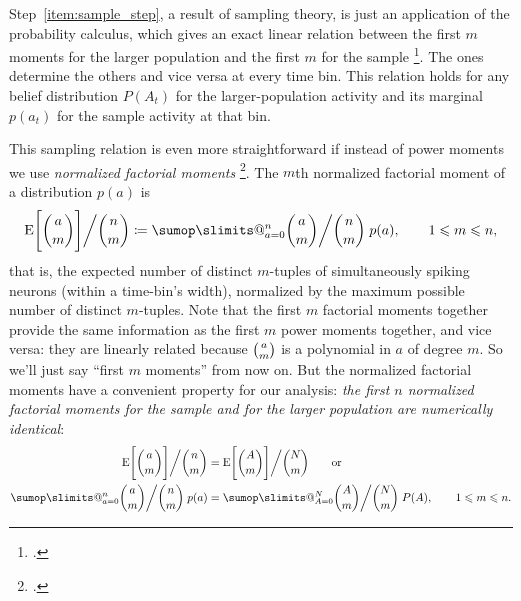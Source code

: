 \documentclass[\ifafour a4paper,12pt,\else a5paper,10pt,\fi%
onecolumn,oneside,article,%
british%
]{memoir}
\makeatletter
\theoremstyle{remark}
\theoremstyle{innote}
\def\sum{\DOTSI\sumop\slimits@}
\newcommand*{\citep}{\footcites}
\newcommand*{\defd}{\coloneqq}
\renewcommand*{\le}{\leqslant}%
\newcommand*{\E}{\mathrm{E}}
\renewcommand*{\|}{\nonscript\,\vert\nonscript\;\mathopen{}}
\newcommand*{\eqns}{eqs}%
\newcommand*{\yAv}{A}
\newcommand*{\yav}{a}
\newcommand*{\ya}{\yav}%
\newcommand*{\yA}{\yAv}%
\newcommand*{\yH}{\varIota}
\newcommand*{\px}{P_{\text{me}}}
\newcommand*{\pxx}{p}
\newcommand*{\pxxx}{P}
\makeatother
\begin{document}
\medskip

Step~\ref{item:sample_step}, a result of sampling theory, is just an
application of the probability calculus, which gives an exact linear
relation between the first $m$ moments for the larger population and the first
$m$ for the sample \citep[\eqns~(16)]{portamanaetal2015}. The ones
determine the others and vice versa at every time bin. This relation holds
for any belief distribution $\pxxx(\yA_{t})$ for the larger-population activity
and its marginal $\pxx(\ya_{t})$ for the sample activity at that bin.

This sampling relation is even more straightforward if instead of power
moments we use \emph{normalized factorial moments} \citep{potts1953}. The
$m$th normalized factorial moment of a distribution $\pxx(\ya)$ is
\begin{equation}
  \label{eq:def_factorial_moment_a}
  \E\Biggl[\binom{\ya}{m} \Biggr]\bigg/\binom{n}{m}
  \defd
  \sum_{\ya=0}^{n} %
  \displaystyle\binom{\ya}{m} \bigg/ \binom{n}{m}\; \pxx(\ya),
  \qquad 1\le m \le n,
\end{equation}
that is, the expected number of distinct $m$-tuples of simultaneously
spiking neurons (within a time-bin's width), normalized by the maximum
possible number of distinct $m$-tuples. %
Note that the first $m$ factorial moments together provide the same
information as the first $m$ power moments together, and vice versa: they
are linearly related because $\tbinom{\ya}{m}$ is a polynomial in $\ya$ of
degree $m$. So we'll just say \enquote{first $m$ moments} from now
on. %
But the normalized factorial moments have a convenient property for our
analysis: \emph{the first $n$ normalized factorial moments for the sample
  and for the larger population are numerically identical}:
\begin{equation}
  \label{eq:equal_m_factorialmoments}
  \begin{split}
  \E\Biggl[\binom{\ya}{m} \Biggr]\bigg/\binom{n}{m}
  &=
  \E\Biggl[\binom{\yA}{m} \Biggr]\bigg/\binom{N}{m}
  \qquad\text{or}\\
    \sum_{\ya=0}^{n} %
  \binom{\ya}{m}\bigg/  \binom{n}{m}\; \pxx(\ya)
&=    \sum_{\yA=0}^{N} %
  \binom{\yA}{m}\bigg/  \binom{N}{m}\; \pxxx(\yA),\qquad
  1\le m \le n.
\end{split}
\end{equation}
\end{document}
